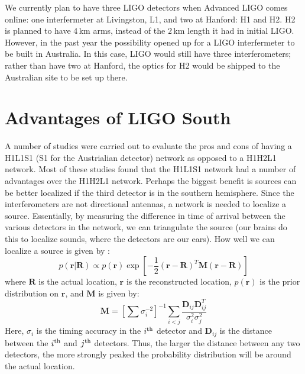 
We currently plan to have three \ac{LIGO} detectors when Advanced LIGO comes online: one interfermeter at Livingston, L1, and two at Hanford: H1 and H2. H2 is planned to have $4\,$km arms, instead of the $2\,$km length it had in initial LIGO. However, in the past year the possibility opened up for a \ac{LIGO} interfermeter to be built in Australia. In this case, LIGO would still have three interferometers; rather than have two at Hanford, the optics for H2 would be shipped to the Australian site to be set up there.

\section{Advantages of LIGO South}

A number of studies were carried out to evaluate the pros and cons of having a H1L1S1 (S1 for the Austrialian detector) network as opposed to a H1H2L1 network. Most of these studies found that the H1L1S1 network had a number of advantages over the H1H2L1 network. Perhaps the biggest benefit is sources can be better localized if the third detector is in the southern hemisphere. Since the interferometers are not directional antennas, a network is needed to localize a source. Essentially, by measuring the difference in time of arrival between the various detectors in the network, we can triangulate the source (our brains do this to localize sounds, where the detectors are our ears). How well we can localize a source is given by \cite{Fairhurst2009, wiki:ligoSth:localization}:
\begin{equation*}
p(\mathbf{r}|\mathbf{R}) \propto p(\mathbf{r})\exp\left[ -\frac{1}{2}(\mathbf{r} - \mathbf{R})^T \mathbf{M}(\mathbf{r}-\mathbf{R})\right]
\end{equation*}
where $\mathbf{R}$ is the actual location, $\mathbf{r}$ is the reconstructed location, $p(\mathbf{r})$ is the prior distribution on $\mathbf{r}$, and $\mathbf{M}$ is given by:
\begin{equation*}
\mathbf{M} = \left[\sum \sigma_i^{-2}\right]^{-1} \sum_{i<j} \frac{\mathbf{D}_{ij}\mathbf{D}^T_{ij}}{\sigma^2_i \sigma^2_j}
\end{equation*}
Here, $\sigma_i$ is the timing accuracy in the $i^{\mathrm{th}}$ detector and $\mathbf{D}_{ij}$ is the distance between the $i^{\mathrm{th}}$ and $j^{\mathrm{th}}$ detectors. Thus, the larger the distance between any two detectors, the more strongly peaked the probability distribution will be around the actual location.

